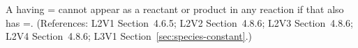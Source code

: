 A \Species having = cannot
appear as a reactant or product in any reaction if that \Species
also has =.  (References: L2V1
Section~4.6.5; L2V2 Section~4.8.6; L2V3 Section~4.8.6; L2V4 Section~4.8.6; 
L3V1 Section~\ref{sec:species-constant}.)
